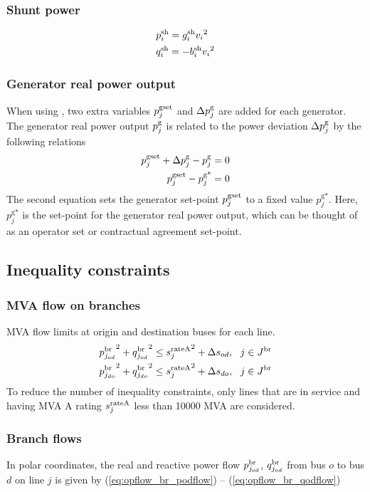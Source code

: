  \subsubsection{Shunt power}
\begin{align}
&p^{\mathrm{sh}}_i = g^\mathrm{sh}_i{v_i}^2 \label{eq:opflow_sh_p} \\
&q^{\mathrm{sh}}_i = -b^\mathrm{sh}_i{v_i}^2 \label{eq:opflow_sh_q}
\end{align}

\subsubsection{Generator real power output}

When using \option{\opflowgensetpoint}, two extra variables $p^{\mathrm{gset}}_j$ and $\Delta{p}^\mathrm{g}_j$ are added for each generator. The generator real power output $p^\mathrm{g}_j$ is related to the power deviation $\Delta{p}^\mathrm{g}_j$ by the following relations
\begin{align}
  p^{\mathrm{gset}}_j + \Delta{p}^\mathrm{g}_j - p^\mathrm{g}_j = 0 \\
  p^{\mathrm{gset}}_j - p^{\text{g*}}_j = 0
\end{align}
The second equation sets the generator set-point $p^{\mathrm{gset}}_j$ to a fixed value $p^{\text{g*}}_j$. Here, $p^{\text{g*}}_j$ is the set-point for the generator real power output, which can be thought of as an operator set or contractual agreement set-point.

\subsection{Inequality constraints}

\subsubsection{MVA flow on branches}
MVA flow limits at origin and destination buses for each line.
\begin{align}
  {p^\mathrm{br}_{j_{od}}}^2 + {q^\mathrm{br}_{j_{od}}}^2 \le {s^{\mathrm{rateA}}_j}^2 + \Delta{s}_{od},~~j \in J^\mathrm{br}\\
  {p^\mathrm{br}_{j_{do}}}^2 + {q^\mathrm{br}_{j_{do}}}^2 \le {s^{\mathrm{rateA}}_j}^2 + \Delta{s}_{do},~~j \in J^\mathrm{br}
\end{align}
To reduce the number of inequality constraints, only lines that are in service and having MVA A rating $s^{\mathrm{rateA}}_j$ less than 10000 MVA are considered.

\subsubsection{Branch flows}
In polar coordinates, the real and reactive power flow $p^\mathrm{br}_{j_{od}}$, $q^\mathrm{br}_{j_{od}}$  from bus $o$ to bus $d$ on line $j$ is given by (\ref{eq:opflow_br_podflow}) -- 
 (\ref{eq:opflow_br_qodflow})


